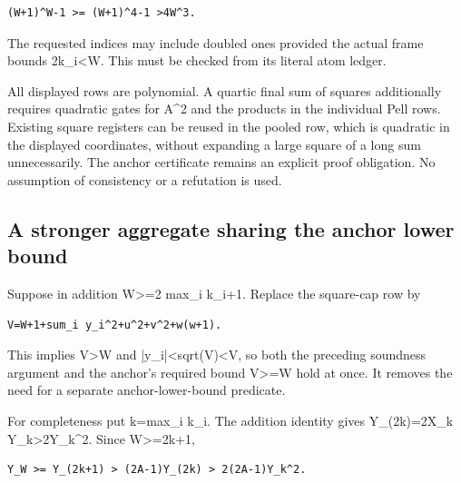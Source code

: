 \begin{verbatim}
(W+1)^W-1 >= (W+1)^4-1 >4W^3.
\end{verbatim}

The requested indices may include doubled ones provided the actual frame bounds 2k\_\allowbreak{}i\textless{}\allowbreak{}W. This must be checked from its literal atom ledger.



All displayed rows are polynomial. A quartic final sum of squares additionally requires quadratic gates for A\textasciicircum{}\allowbreak{}2 and the products in the individual Pell rows. Existing square registers can be reused in the pooled row, which is quadratic in the displayed coordinates, without expanding a large square of a long sum unnecessarily. The anchor certificate remains an explicit proof obligation. No assumption of consistency or a refutation is used.



\subsection{A stronger aggregate sharing the anchor lower bound}



Suppose in addition W\textgreater{}\allowbreak{}=\allowbreak{}2 max\_\allowbreak{}i k\_\allowbreak{}i+\allowbreak{}1. Replace the square-cap row by



\begin{verbatim}
V=W+1+sum_i y_i^2+u^2+v^2+w(w+1).
\end{verbatim}

This implies V\textgreater{}\allowbreak{}W and |y\_\allowbreak{}i|\textless{}\allowbreak{}sqrt(V)\textless{}\allowbreak{}V, so both the preceding soundness argument and the anchor's required bound V\textgreater{}\allowbreak{}=\allowbreak{}W hold at once. It removes the need for a separate anchor-lower-bound predicate.



For completeness put k=\allowbreak{}max\_\allowbreak{}i k\_\allowbreak{}i. The addition identity gives Y\_\allowbreak{}(2k)=\allowbreak{}2X\_\allowbreak{}k Y\_\allowbreak{}k\textgreater{}\allowbreak{}2Y\_\allowbreak{}k\textasciicircum{}\allowbreak{}2. Since W\textgreater{}\allowbreak{}=\allowbreak{}2k+\allowbreak{}1,



\begin{verbatim}
Y_W >= Y_(2k+1) > (2A-1)Y_(2k) > 2(2A-1)Y_k^2.
\end{verbatim}

